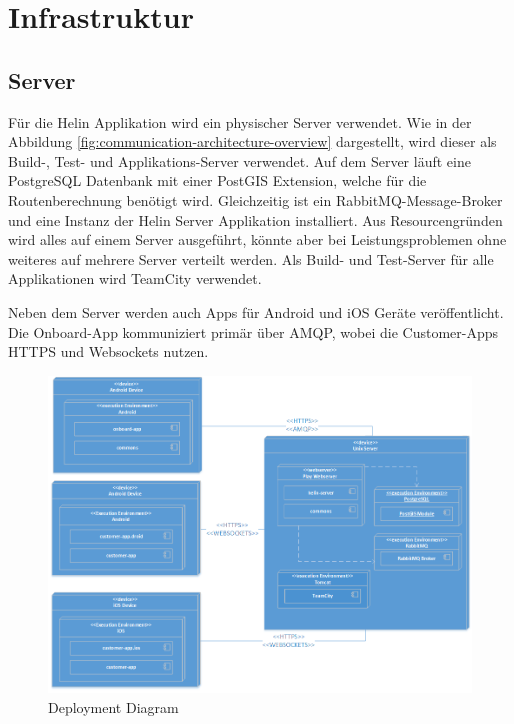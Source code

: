 \newpage

\chapter{Infrastruktur}

\section{Server}

Für die Helin Applikation wird ein physischer Server verwendet. Wie in der Abbildung \ref{fig:communication-architecture-overview} dargestellt, wird dieser als Build-, Test- und Applikations-Server verwendet. 
Auf dem Server läuft eine PostgreSQL Datenbank mit einer PostGIS Extension, welche für die Routenberechnung benötigt wird. Gleichzeitig ist ein RabbitMQ-Message-Broker und eine Instanz der Helin Server Applikation installiert. Aus Resourcengründen wird alles auf einem Server ausgeführt, könnte aber bei Leistungsproblemen ohne weiteres auf mehrere Server verteilt werden. Als Build- und Test-Server für alle Applikationen wird TeamCity verwendet. 

Neben dem Server werden auch Apps für Android und iOS Geräte veröffentlicht. Die Onboard-App kommuniziert primär über AMQP, wobei die Customer-Apps HTTPS und Websockets nutzen.

\begin{figure}[h]
	\includegraphics[width=1.0\textwidth]{images/DeploymentDiagram.png}
	\caption{Deployment Diagram}
	\label{fig:deployment-diagram}
\end{figure}



